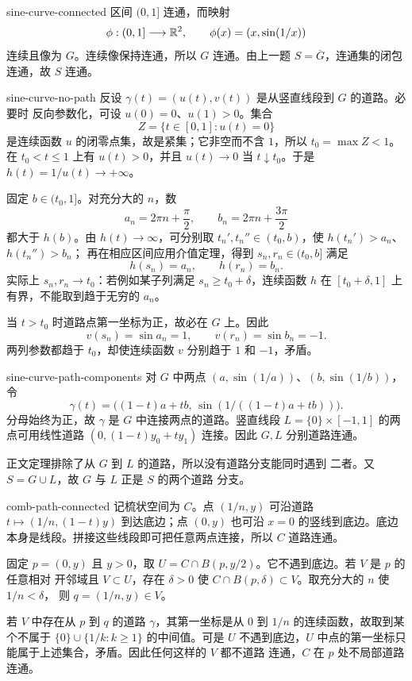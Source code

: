 \begin{solution}{sine-curve-connected}
区间 \((0,1]\) 连通，而映射
\[
 \phi:(0,1]\longrightarrow\mathbb{R}^2,\qquad
 \phi(x)=(x,\sin(1/x))
\]
连续且像为 \(G\)。连续像保持连通，所以 \(G\) 连通。由上一题
\(S=\overline G\)，连通集的闭包连通，故 \(S\) 连通。
\end{solution}

\begin{solution}{sine-curve-no-path}
反设 \(\gamma(t)=(u(t),v(t))\) 是从竖直线段到 \(G\) 的道路。必要时
反向参数化，可设 \(u(0)=0\)、\(u(1)>0\)。集合
\[
 Z=\{t\in[0,1]:u(t)=0\}
\]
是连续函数 \(u\) 的闭零点集，故是紧集；它非空而不含 \(1\)，所以
\(t_0=\max Z<1\)。在 \(t_0<t\le1\) 上有 \(u(t)>0\)，并且
\(u(t)\to0\) 当 \(t\downarrow t_0\)。于是
\(h(t)=1/u(t)\to+\infty\)。

固定 \(b\in(t_0,1]\)。对充分大的 \(n\)，数
\[
 a_n=2\pi n+\frac{\pi}{2},\qquad
 b_n=2\pi n+\frac{3\pi}{2}
\]
都大于 \(h(b)\)。由 \(h(t)\to\infty\)，可分别取
\(t_n',t_n''\in(t_0,b)\)，使 \(h(t_n')>a_n\)、\(h(t_n'')>b_n\)；
再在相应区间应用介值定理，得到 \(s_n,r_n\in(t_0,b]\) 满足
\[
 h(s_n)=a_n,\qquad h(r_n)=b_n.
\]
实际上 \(s_n,r_n\to t_0\)：若例如某子列满足
\(s_n\ge t_0+\delta\)，连续函数 \(h\) 在
\([t_0+\delta,1]\) 上有界，不能取到趋于无穷的 \(a_n\)。

当 \(t>t_0\) 时道路点第一坐标为正，故必在 \(G\) 上。因此
\[
 v(s_n)=\sin a_n=1,\qquad v(r_n)=\sin b_n=-1.
\]
两列参数都趋于 \(t_0\)，却使连续函数 \(v\) 分别趋于 \(1\) 和
\(-1\)，矛盾。
\end{solution}

\begin{solution}{sine-curve-path-components}
对 \(G\) 中两点
\((a,\sin(1/a))\)、\((b,\sin(1/b))\)，令
\[
 \gamma(t)=\bigl((1-t)a+tb,\,
       \sin(1/((1-t)a+tb))\bigr).
\]
分母始终为正，故 \(\gamma\) 是 \(G\) 中连接两点的道路。竖直线段
\(L=\{0\}\times[-1,1]\) 的两点可用线性道路
\((0,(1-t)y_0+ty_1)\) 连接。因此 \(G,L\) 分别道路连通。

正文定理排除了从 \(G\) 到 \(L\) 的道路，所以没有道路分支能同时遇到
二者。又 \(S=G\cup L\)，故 \(G\) 与 \(L\) 正是 \(S\) 的两个道路
分支。
\end{solution}

\begin{solution}{comb-path-connected}
记梳状空间为 \(C\)。点 \((1/n,y)\) 可沿道路
\(t\mapsto(1/n,(1-t)y)\) 到达底边；点 \((0,y)\) 也可沿 \(x=0\)
的竖线到底边。底边本身是线段。拼接这些线段即可把任意两点连接，所以
\(C\) 道路连通。

固定 \(p=(0,y)\) 且 \(y>0\)，取
\(U=C\cap B(p,y/2)\)。它不遇到底边。若 \(V\) 是 \(p\) 的任意相对
开邻域且 \(V\subset U\)，存在 \(\delta>0\) 使
\(C\cap B(p,\delta)\subset V\)。取充分大的 \(n\) 使 \(1/n<\delta\)，
则 \(q=(1/n,y)\in V\)。

若 \(V\) 中存在从 \(p\) 到 \(q\) 的道路 \(\gamma\)，其第一坐标是从
\(0\) 到 \(1/n\) 的连续函数，故取到某个不属于
\(\{0\}\cup\{1/k:k\ge1\}\) 的中间值。可是 \(U\) 不遇到底边，\(U\)
中点的第一坐标只能属于上述集合，矛盾。因此任何这样的 \(V\) 都不道路
连通，\(C\) 在 \(p\) 处不局部道路连通。
\end{solution}

